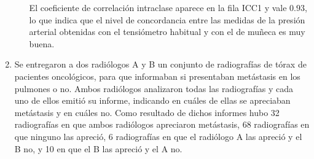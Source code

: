 \begin{enumerate}[leftmargin=*]
\begin{enumerate}
\begin{indicacion}
{El coeficiente de correlación intraclase aparece en la fila ICC1 y vale $0.93$, lo que indica que el nivel de
concordancia entre las medidas de la presión arterial obtenidas con el tensiómetro habitual y con el de muñeca es muy
buena.}
\end{indicacion}

% 
\end{enumerate}


\item Se entregaron a dos radiólogos A y B un conjunto de radiografías de tórax de pacientes oncológicos, para que
informaban si presentaban metástasis en los pulmones o no. Ambos radiólogos analizaron todas las radiografías y cada uno
de ellos emitió su informe, indicando en cuáles de ellas se apreciaban metástasis y en cuáles no. Como resultado de
dichos informes hubo 32 radiografías en que ambos radiólogos apreciaron metástasis, 68 radiografías en que ninguno las
apreció, 6 radiografías en que el radiólogo A las apreció y el B no, y 10 en que el B las apreció y el A no.


\end{enumerate}
